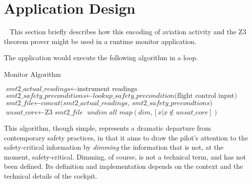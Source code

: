 \section{Application Design}~\label{application}
This section briefly describes how this encoding of aviation activity and the Z3 theorem prover might be used in a runtime monitor application.

The application would execute the following algorithm in a loop.

	\begin{algorithm}[H]
	\caption{Monitor Algorithm}\label{monitor}
	\begin{algorithmic}
			\State $\textit{smt2\_actual\_readings} \gets \text{instrument readings}$
			\State $\textit{smt2\_safety\_preconditions} \gets \textit{lookup\_safety\_precondition(}\text{flight control input}\textit{)}$
			\State $\textit{smt2\_file} \gets \textit{concat(smt2\_actual\_readings, smt2\_safety\_precondtions)}$
			\State $\textit{unsat\_core} \gets \text{Z3 } \textit{smt2\_file}$
			 $\textit{undim all}$ 
			\State $\textit{map}(\textit{dim}, [x|x \not\in \textit{unsat\_core}])$
			\EndIf
			\EndWhile
	\end{algorithmic}
	\end{algorithm}

This algorithm, though simple, represents a dramatic departure from contemporary safety practices, in that it aims to draw the pilot's attention to the safety-critical information by \emph{dimming} the information that is not, at the moment, safety-critical. Dimming, of course, is not a technical term, and has not been defined. Its definition and implementation depends on the context and the technical details of the cockpit. 


